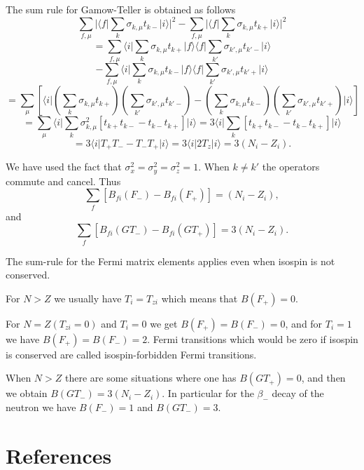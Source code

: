 \documentclass[graybox,sectrefs,envcountresetchap,open=right]{svmonodo}
\begin{document}
The sum rule for Gamow-Teller is obtained as follows
\[
\sum_{f,\mu}  \vert \langle f\vert  \sum_{k} \sigma_{k,\mu} t_{k-} \vert i\rangle\vert^{2}
- \sum_{f,\mu} \vert \langle f\vert  \sum_{k} \sigma_{k,\mu } t_{k+} \vert i\rangle\vert^{2}
\]
\[
= \sum_{f,\mu}\langle i\vert  \sum_{k} \sigma_{k,\mu} t_{k+} \vert f\rangle\langle f\vert  \sum_{k'} 
\sigma_{k',\mu} t_{k'-} \vert i\rangle
\]
\[
-  \sum_{f,\mu}
\langle i\vert  \sum_{k} \sigma_{k,\mu } t_{k-} \vert f\rangle\langle f\vert\sum_{k'} 
\sigma_{k',\mu } t_{k'+} \vert i\rangle
\]
\[
= \sum_{\mu} \left[\langle i\vert  \left(\sum _{k} \sigma_{k,\mu} t_{k+} \right)
    \left( \sum_{k'} \sigma_{k',\mu} t_{k'-}\right)
-   \left( \sum_{k} \sigma_{k,\mu} t_{k-} \right)
\left( \sum_{k'} \sigma_{k',\mu} t_{k'+} \right) \vert i\rangle
\right]
\]
\[
= \sum_{\mu }
\langle i\vert  \sum_{k}  \sigma ^{2}_{k,\mu } \left[ t_{k+} t_{k-} - t_{k-} t_{k+} \right] 
\vert i\rangle
= 3
\langle i\vert  \sum_{k} \left[ t_{k+} t_{k-} - t_{k-} t_{k+} \right] \vert i\rangle
\]
\[
=   3\langle i\vert  T_{+} T_{-} -  T_{-} T_{+}\vert i\rangle= 3\langle i\vert  2T_{z}\vert i\rangle  = 3(N_{i}-Z_{i}). 
\]



We have used the fact that $\sigma ^{2}_{x} = \sigma ^{2}_{y}=\sigma ^{2}_{z}=1$.
When $k \neq k'$ the operators commute and cancel.
Thus
\[
\sum_{f} \left[B_{fi}(F_{-}) - B_{fi}(F_{+}) \right] = (N_{i}-Z_{i}),       
\]
and
\[
\sum_{f} \left[ B_{fi}(GT_{-}) - B_{fi}(GT_{+}) \right] = 3(N_{i}-Z_{i}).       
\]

The sum-rule for the Fermi matrix elements applies even
when isospin is not conserved.


For $N > Z$ we usually have
$T_{i}=T_{zi}$ which means that $B(F_{+})=0$.

For $N=Z (T_{zi}=0)$ and $T_{i}=0$ we get 
$B(F_{+})=B(F_{-})=0$, and for $T_{i}=1$ we
have $B(F_{+}) = B(F_{-}) = 2$. Fermi transitions which would be zero
if isospin is conserved are called isospin-forbidden Fermi transitions.

When $N > Z$ there are some situations where one has $B(GT_{+})=0$,
and then we obtain $B(GT_{-}) = 3(N_{i}-Z_{i})$. In particular
for the $\beta_{-}$ decay of the neutron we have $B(F_{-})=1$
and $B(GT_{-})=3$.



























\section{References}




\clearemptydoublepage
{}
\thispagestyle{empty}
\printindex
\end{document}
